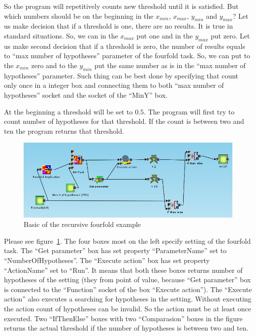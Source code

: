 \documentclass[a4paper,12pt]{book}
\begin{document}
So the program will repetitively counts new threshold until it is satisfied. But which numbers should be on the beginning in the $x_{min}$, $x_{max}$, $y_{min}$ and $y_{max}$? Let us make decision that if a threshold is one, there are no results. It is true in standard situations. So, we can in the $x_{max}$ put one and in the $y_{max}$ put zero. Let us make second decision that if a threshold is zero, the number of results equals to ``max number of hypotheses'' parameter of the fourfold task. So, we can put to the $x_{min}$ zero and to the $y_{min}$ put the same number as is in the ``max number of hypotheses'' parameter. Such thing can be best done by specifying that count only once in a integer box and connecting them to both ``max number of hypotheses'' socket and the socket of the ``MinY'' box.

At the beginning a threshold will be set to $0.5$. The program will first try to count number of hypotheses for that threshold. If the count is between two and ten the program returns that threshold.   

\begin{figure}
	\includegraphics[width=1\textwidth]{exampleMainMiningPart}
	\caption{Basic of the recursive fourfold example}
	\label{fig:basicRecursiveExample}
\end{figure}

Please see figure~\ref{fig:basicRecursiveExample}. The four boxes most on the left specify setting of the fourfold task. The ``Get parameter'' box has set property ``ParameterName'' set to ``NumberOfHypotheses''. The ``Execute action'' box has set property ``ActionName'' set to ``Run''. It means that both these boxes returns number of hypotheses of the setting (they from point of value, because ``Get parameter'' box is connected to the ``Function'' socket of the box ``Execute action''). The ``Execute action'' also executes a searching for hypotheses in the setting. Without executing the action count of hypotheses can be invalid. So the action must be at least once executed. Two ``IfThenElse'' boxes with two ``Comparasion'' boxes in the figure returns the actual threshold if the number of hypotheses is between two and ten.
\end{document}
